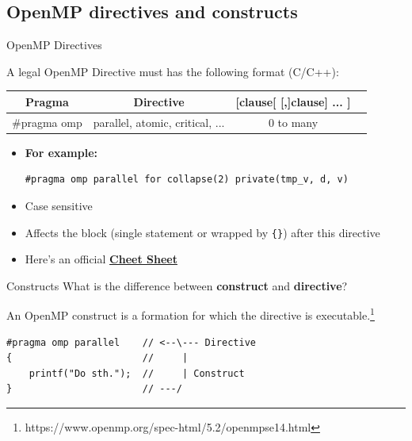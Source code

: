 \subsection{OpenMP directives and constructs}

\begin{frame}[fragile]{OpenMP Directives}

  \begin{block}{A legal OpenMP Directive must has the following format (C/C++):}
    \begin{tabular}{|c|c|c|c|}
      \hline
      Pragma       & Directive                       & [clause[ [,]clause] ... ] \\
      \hline
      \#pragma omp & parallel, atomic, critical, ... & 0 to many                 \\
      \hline
    \end{tabular}
  \end{block}
  \begin{itemize}
    \item {} \textbf{For example:}
          \vspace{-5pt}
          \begin{verbatim}
#pragma omp parallel for collapse(2) private(tmp_v, d, v)
    \end{verbatim}
    \item Case sensitive
    \item Affects the block (single statement or wrapped by \verb|{}|) after this directive
    \item {} Here's an official \href{https://www.openmp.org/wp-content/uploads/OpenMPRefCard-5-2-web.pdf}{\textbf{Cheet Sheet}}
  \end{itemize}
\end{frame}

\begin{frame}[fragile]{Constructs}
   What is the difference between \textbf{construct} and \textbf{directive}?

   An OpenMP construct is a formation for which the directive is executable.\footnote{https://www.openmp.org/spec-html/5.2/openmpse14.html}

  \begin{verbatim}
#pragma omp parallel    // <--\--- Directive
{                       //     |
    printf("Do sth.");  //     | Construct
}                       // ---/
\end{verbatim}

\end{frame}

